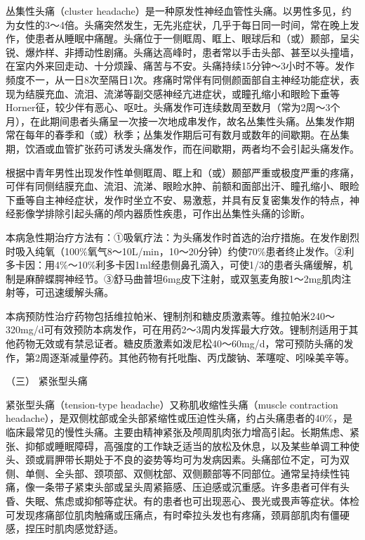 丛集性头痛（cluster
headache）是一种原发性神经血管性头痛。以男性多见，约为女性的3～4倍。头痛突然发生，无先兆症状，几乎于每日同一时间，常在晚上发作，使患者从睡眠中痛醒。头痛位于一侧眶周、眶上、眼球后和（或）颞部，呈尖锐、爆炸样、非搏动性剧痛。头痛达高峰时，患者常以手击头部、甚至以头撞墙，在室内外来回走动、十分烦躁、痛苦与不安。头痛持续15分钟～3小时不等。发作频度不一，从一日8次至隔日1次。疼痛时常伴有同侧颜面部自主神经功能症状，表现为结膜充血、流泪、流涕等副交感神经亢进症状，或瞳孔缩小和眼睑下垂等Horner征，较少伴有恶心、呕吐。头痛发作可连续数周至数月（常为2周～3个月），在此期间患者头痛呈一次接一次地成串发作，故名丛集性头痛。丛集发作期常在每年的春季和（或）秋季；丛集发作期后可有数月或数年的间歇期。在丛集期，饮酒或血管扩张药可诱发头痛发作，而在间歇期，两者均不会引起头痛发作。

根据中青年男性出现发作性单侧眶周、眶上和（或）颞部严重或极度严重的疼痛，可伴有同侧结膜充血、流泪、流涕、眼睑水肿、前额和面部出汗、瞳孔缩小、眼睑下垂等自主神经症状，发作时坐立不安、易激惹，并具有反复密集发作的特点，神经影像学排除引起头痛的颅内器质性疾患，可作出丛集性头痛的诊断。

本病急性期治疗方法有：①吸氧疗法：为头痛发作时首选的治疗措施。在发作剧烈时吸入纯氧（100\%氧气8～10L/min，10～20分钟）约使70\%患者终止发作。②利多卡因：用4\%～10\%利多卡因1ml经患侧鼻孔滴入，可使1/3的患者头痛缓解，机制是麻醉蝶腭神经节。③舒马曲普坦6mg皮下注射，或双氢麦角胺1～2mg肌肉注射等，可迅速缓解头痛。

本病预防性治疗药物包括维拉帕米、锂制剂和糖皮质激素等。维拉帕米240～320mg/d可有效预防本病发作，可在用药2～3周内发挥最大疗效。锂制剂适用于其他药物无效或有禁忌证者。糖皮质激素如泼尼松40～60mg/d，常可预防头痛的发作，第2周逐渐减量停药。其他药物有托吡酯、丙戊酸钠、苯噻啶、吲哚美辛等。

\hypertarget{text00020.htmlux5cux23CHP1-7-4-3}{}
（三） 紧张型头痛

紧张型头痛（tension-type headache）又称肌收缩性头痛（muscle contraction
headache），是双侧枕部或全头部紧缩性或压迫性头痛，约占头痛患者的40\%，是临床最常见的慢性头痛。主要由精神紧张及颅周肌肉张力增高引起。长期焦虑、紧张、抑郁或睡眠障碍，高强度的工作缺乏适当的放松及休息，以及某些单调工种使头、颈或肩胛带长期处于不良的姿势等均可为发病因素。头痛部位不定，可为双侧、单侧、全头部、颈项部、双侧枕部、双侧颞部等不同部位。通常呈持续性钝痛，像一条带子紧束头部或呈头周紧箍感、压迫感或沉重感。许多患者可伴有头昏、失眠、焦虑或抑郁等症状。有的患者也可出现恶心、畏光或畏声等症状。体检可发现疼痛部位肌肉触痛或压痛点，有时牵拉头发也有疼痛，颈肩部肌肉有僵硬感，捏压时肌肉感觉舒适。

